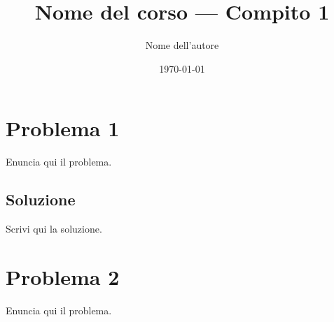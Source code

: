 \documentclass[11pt]{article}
\title{Nome del corso — Compito 1}
\author{Nome dell'autore}
\date{\today}
\begin{document}
\maketitle

\section*{Problema 1}
Enuncia qui il problema.

\subsection*{Soluzione}
Scrivi qui la soluzione.

\section*{Problema 2}
Enuncia qui il problema.
\end{document}
